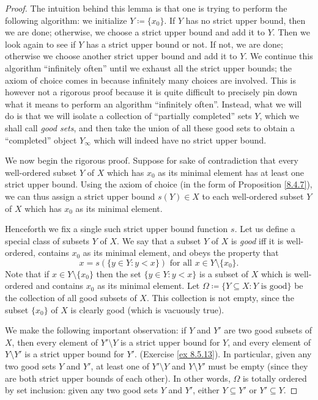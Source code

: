 \begin{proof}
    The intuition behind this lemma is that one is trying to perform the following algorithm:
    we initialize \(Y \coloneqq \{x_0\}\).
    If \(Y\) has no strict upper bound, then we are done;
    otherwise, we choose a strict upper bound and add it to \(Y\).
    Then we look again to see if \(Y\) has a strict upper bound or not.
    If not, we are done;
    otherwise we choose another strict upper bound and add it to \(Y\).
    We continue this algorithm ``infinitely often'' until we exhaust all the strict upper bounds;
    the axiom of choice comes in because infinitely many choices are involved.
    This is however not a rigorous proof because it is quite difficult to precisely pin down what it means to perform an algorithm ``infinitely often''.
    Instead, what we will do is that we will isolate a collection of ``partially completed'' sets \(Y\), which we shall call \emph{good sets}, and then take the union of all these good sets to obtain a ``completed'' object \(Y_{\infty}\) which will indeed have no strict upper bound.

    We now begin the rigorous proof.
    Suppose for sake of contradiction that every well-ordered subset \(Y\) of \(X\) which has \(x_0\) as its minimal element has at least one strict upper bound.
    Using the axiom of choice (in the form of Proposition \ref{8.4.7}), we can thus assign a strict upper bound \(s(Y) \in X\) to each well-ordered subset \(Y\) of \(X\) which has \(x_0\) as its minimal element.

    Henceforth we fix a single such strict upper bound function \(s\).
    Let us define a special class of subsets \(Y\) of \(X\).
    We say that a subset \(Y\) of \(X\) is \emph{good} iff it is well-ordered, contains \(x_0\) as its minimal element, and obeys the property that
    \[
        x = s(\{y \in Y : y < x\}) \text{ for all } x \in Y \setminus \{x_0\}.
    \]
    Note that if \(x \in Y \setminus \{x_0\}\) then the set \(\{y \in Y : y < x\}\) is a subset of \(X\) which is well-ordered and contains \(x_0\) as its minimal element.
    Let \(\Omega \coloneqq \{Y \subseteq X : Y \text{ is good}\}\) be the collection of all good subsets of \(X\).
    This collection is not empty, since the subset \(\{x_0\}\) of \(X\) is clearly good
    (which is vacuously true).

    We make the following important observation:
    if \(Y\) and \(Y'\) are two good subsets of \(X\), then every element of \(Y' \setminus Y\) is a strict upper bound for \(Y\), and every element of \(Y \setminus Y'\) is a strict upper bound for \(Y'\).
    (Exercise \ref{ex 8.5.13}).
    In particular, given any two good sets \(Y\) and \(Y'\), at least one of \(Y' \setminus Y\) and \(Y \setminus Y'\) must be empty
    (since they are both strict upper bounds of each other).
    In other words, \(\Omega\) is totally ordered by set inclusion:
    given any two good sets \(Y\) and \(Y'\), either \(Y \subseteq Y'\) or \(Y' \subseteq Y\).


\end{proof}
